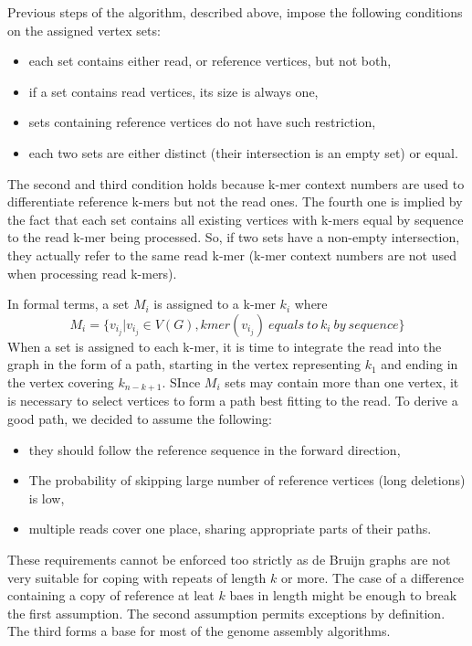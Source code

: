 Previous steps of the algorithm, described above, impose the following conditions on the assigned vertex sets:
\begin{itemize}
\item each set contains either read, or reference vertices, but not both,
\item if a set contains read vertices, its size is always one,
\item sets containing reference vertices do not have such restriction,
\item each two sets are either distinct (their intersection is an empty set) or equal.
\end{itemize}
The second and third condition holds because k-mer context numbers are used to differentiate reference k-mers but not the read ones. The fourth one is implied by the fact that each set contains all existing vertices with k-mers equal by sequence to the read k-mer being processed. So, if two sets have a non-empty intersection, they actually refer to the same read k-mer (k-mer context numbers are not used when processing read k-mers).

In formal terms, a set $M_i$ is assigned to a k-mer $k_i$ where
$$
M_i = \{v_{i_j} | v_{i_j} \in V(G), kmer(v_{i_j})\: equals\: to\: k_i\: by\: sequence\}
$$ 
When a set is assigned to each k-mer, it is time to integrate the read into the graph in the form of a path, starting in the vertex representing $k_1$ and ending in the vertex covering $k_{n-k+1}$. SInce $M_i$ sets may contain more than one vertex, it is necessary to select vertices to form a path best fitting to the read. To derive a good path, we decided to assume the following:
\begin{itemize}
\item they should follow the reference sequence in the forward direction,
\item The probability of skipping large number of reference vertices (long deletions) is low,
\item multiple reads cover one place, sharing appropriate parts of their paths.
\end{itemize}

These requirements cannot be enforced too strictly as de Bruijn graphs are not very suitable for coping with repeats of length $k$ or more. The case of a difference containing a copy of reference at leat $k$ baes in length might be enough to break the first assumption. The second assumption permits exceptions by definition. The third forms a base for most of the genome assembly algorithms.


